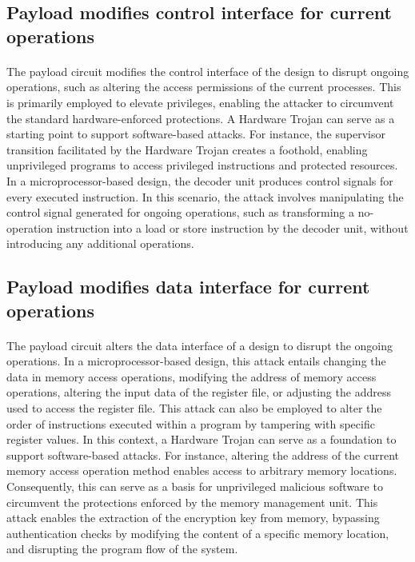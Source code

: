 \subsection{Payload modifies control interface for current operations}
\paragraph*{}
The payload circuit modifies the control interface of the design to disrupt ongoing operations, such as altering the access permissions of the current processes. This is primarily employed to elevate privileges, enabling the attacker to circumvent the standard hardware-enforced protections. A Hardware Trojan can serve as a starting point to support software-based attacks. For instance, the supervisor transition facilitated by the Hardware Trojan creates a foothold, enabling unprivileged programs to access privileged instructions and protected resources. In a microprocessor-based design, the decoder unit produces control signals for every executed instruction. In this scenario, the attack involves manipulating the control signal generated for ongoing operations, such as transforming a no-operation instruction into a load or store instruction by the decoder unit, without introducing any additional operations.

\subsection{Payload modifies data interface for current operations}
\paragraph*{}
The payload circuit alters the data interface of a design to disrupt the ongoing operations. In a microprocessor-based design, this attack entails changing the data in memory access operations, modifying the address of memory access operations, altering the input data of the register file, or adjusting the address used to access the register file. This attack can also be employed to alter the order of instructions executed within a program by tampering with specific register values. In this context, a Hardware Trojan can serve as a foundation to support software-based attacks. For instance, altering the address of the current memory access operation method enables access to arbitrary memory locations. Consequently, this can serve as a basis for unprivileged malicious software to circumvent the protections enforced by the memory management unit. This attack enables the extraction of the encryption key from memory, bypassing authentication checks by modifying the content of a specific memory location, and disrupting the program flow of the system.

